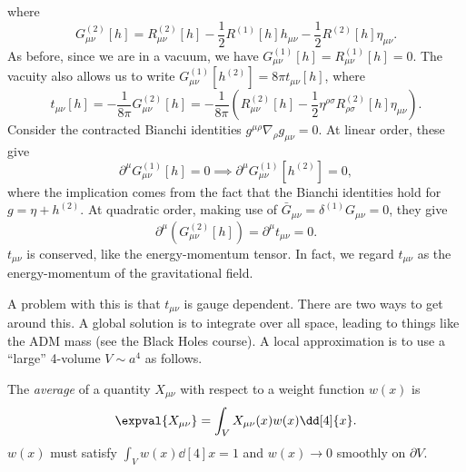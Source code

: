 \documentclass{jknotes}
\begin{document}
where
\begin{equation}
    G^{(2)}_{\mu\nu}[h] = R^{(2)}_{\mu\nu}[h] - \frac12 R^{(1)}[h]h_{\mu\nu} - \frac12 R^{(2)}[h]\eta_{\mu\nu}.
\end{equation}
As before, since we are in a vacuum, we have \(G^{(1)}_{\mu\nu}[h] = R^{(1)}_{\mu\nu}[h] = 0\). The vacuity also allows us to write \(G^{(1)}_{\mu\nu}[h^{(2)}] = 8\pi t_{\mu\nu}[h]\), where
\begin{equation}
    t_{\mu\nu}[h] = -\frac1{8\pi}G^{(2)}_{\mu\nu}[h] = -\frac1{8\pi}(R^{(2)}_{\mu\nu}[h] - \frac12\eta^{\rho\sigma} R^{(2)}_{\rho\sigma}[h]\eta_{\mu\nu}).
\end{equation}
Consider the contracted Bianchi identities \(g^{\mu\rho}\nabla_\rho g_{\mu\nu} = 0\). At linear order, these give
\begin{equation}
    \partial^\mu G^{(1)}_{\mu\nu}[h] = 0 \implies \partial^\mu G^{(1)}_{\mu\nu}[h^{(2)}] = 0,
\end{equation}
where the implication comes from the fact that the Bianchi identities hold for \(g=\eta+h^{(2)}\). At quadratic order, making use of \(\bar{G}_{\mu\nu} = \delta^{(1)}G_{\mu\nu} = 0\), they give 
\begin{equation}
    \partial^\mu(G^{(2)}_{\mu\nu}[h]) = \partial^\mu t_{\mu\nu} = 0.
\end{equation}
\(t_{\mu\nu}\) is conserved, like the energy-momentum tensor. In fact, we regard \(t_{\mu\nu}\) as the energy-momentum of the gravitational field.

A problem with this is that \(t_{\mu\nu}\) is gauge dependent. There are two ways to get around this. A global solution is to integrate over all space, leading to things like the ADM mass (see the Black Holes course). A local approximation is to use a ``large'' 4-volume \(V\sim a^4\) as follows.

\begin{defn}
    The \emph{average} of a quantity \(X_{\mu\nu}\) with respect to a weight function \(w(x)\) is 
    \begin{equation}
        \expval{X_{\mu\nu}} = \int_V X_{\mu\nu}(x) w(x) \dd[4]{x}.
    \end{equation}
    \(w(x)\) must satisfy \(\int_V w(x)\dd[4]{x}=1\) and \(w(x)\to 0\) smoothly on \(\partial V\).
\end{defn}
\end{document}
